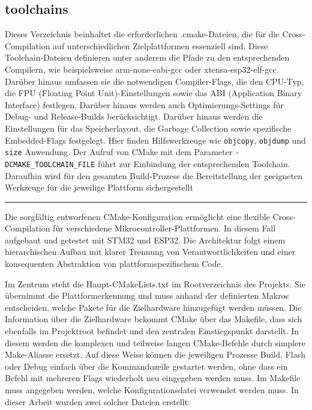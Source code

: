 \subsection*{toolchains}
Dieses Verzeichnis beinhaltet die erforderlichen .cmake-Dateien, die für die Cross-Compilation auf unterschiedlichen Zielplattformen essenziell sind.
Diese Toolchain-Dateien definieren unter anderem die Pfade zu den entsprechenden Compilern, wie beispielsweise arm-none-eabi-gcc oder xtensa-esp32-elf-gcc. Darüber hinaus umfassen sie die notwendigen Compiler-Flags, die den CPU-Typ, die FPU (Floating Point Unit)-Einstellungen sowie das ABI (Application Binary Interface) festlegen. 
Darüber hinaus werden auch Optimierungs-Settings für Debug- und Release-Builds berücksichtigt. Darüber hinaus werden die Einstellungen für das Speicherlayout, die Garbage Collection sowie spezifische Embedded-Flags festgelegt. 
Hier finden Hilfswerkzeuge wie \texttt{objcopy}, \texttt{objdump} und \texttt{size} Anwendung.
Der Aufruf von CMake mit dem Parameter \texttt{-DCMAKE\_TOOLCHAIN\_FILE} führt zur Einbindung der entsprechenden Toolchain. 
Daraufhin wird für den gesamten Build-Prozess die Bereitstellung der geeigneten Werkzeuge für die jeweilige Plattform sichergestellt

\vspace{0.5em}
\noindent\rule{\linewidth}{0.4pt}
\vspace{0.5em}

Die sorgfältig entworfenen CMake-Konfiguration ermöglicht eine flexible Cross-Compilation für verschiedene Mikrocontroller-Plattformen.
In diesem Fall aufgebaut und getestet mit STM32 und ESP32. 
Die Architektur folgt einem hierarchischen Aufbau mit klarer Trennung von Verantwortlichkeiten und einer konsequenten Abstraktion von plattformspezifischem Code.

Im Zentrum steht die Haupt-CMakeLists.txt im Rootverzeichnis des Projekts. 
Sie übernimmt die Plattformerkennung und muss anhand der definierten Makros entscheiden, welche Pakete für die Zielhardware hinzugefügt werden müssen. 
Die Information über die Zielhardware bekommt CMake über das Makefile, dass sich ebenfalls im Projektroot befindet und den zentralen Einstiegspunkt darstellt.
In diesem werden die komplexen und teilweise langen CMake-Befehle durch simplere Make-Aliasse ersetzt.
Auf diese Weise können die jeweiligen Prozesse Build, Flash oder Debug einfach über die Kommandozeile gestartet werden, ohne dass ein Befehl mit mehreren Flags wiederholt neu eingegeben werden muss. 
Im Makefile muss angegeben werden, welche Konfigurationsdatei verwendet werden muss.
In dieser Arbeit wurden zwei solcher Dateien erstellt:


